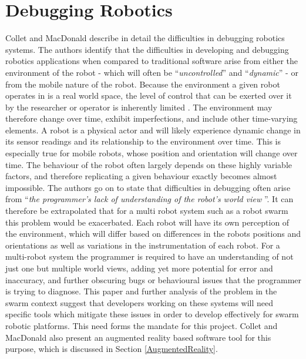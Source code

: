 \section{Debugging Robotics} \label{RoboticsDebugging}
Collet and MacDonald \cite{Collet:2006} describe in detail the difficulties in debugging robotics systems. The authors identify that the difficulties in developing and debugging robotics applications when compared to traditional software arise from either the environment of the robot - which will often be ``\textit{uncontrolled}'' and ``\textit{dynamic}'' - or from the mobile nature of the robot. Because the environment a given robot operates in is a real world space, the level of control that can be exerted over it by the researcher or operator is inherently limited \cite{Collet:2006}. The environment may therefore change over time, exhibit imperfections, and include other time-varying elements. A robot is a physical actor and will likely experience dynamic change in its sensor readings and its relationship to the environment over time. This is especially true for mobile robots, whose position and orientation will change over time. The behaviour of the robot often largely depends on these highly variable factors, and therefore replicating a given behaviour exactly becomes almost impossible. The authors go on to state that difficulties in debugging often arise from ``\textit{the programmer's lack of understanding of the robot's world view} \cite{Collet:2006}''. It can therefore be extrapolated that for a multi robot system such as a robot swarm this problem would be exacerbated. Each robot will have its own perception of the environment, which will differ based on differences in the robots positions and orientations as well as variations in the instrumentation of each robot. For a multi-robot system the programmer is required to have an understanding of not just one but multiple world views, adding yet more potential for error and inaccuracy, and further obscuring bugs or behavioural issues that the programmer is trying to diagnose. This paper \cite{Collet:2006} and further analysis of the problem in the swarm context suggest that developers working on these systems will need specific tools which mitigate these issues in order to develop effectively for swarm robotic platforms. This need forms the mandate for this project. Collet and MacDonald \cite{Collet:2006} also present an augmented reality based software tool for this purpose, which is discussed in Section \ref{AugmentedReality}.


